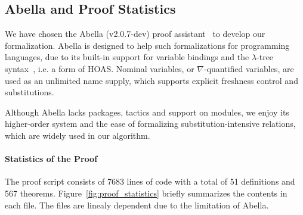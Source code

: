 \subsection{Abella and Proof Statistics}
We have chosen the Abella (v2.0.7-dev) proof assistant~\cite{AbellaDesc} to develop our formalization.
Abella is designed to help such formalizations for programming languages,
due to its built-in support for variable bindings and
the $\lambda$-tree syntax~\cite{}, i.e. a form of HOAS.
Nominal variables, or $\nabla$-quantified variables, are used as an unlimited name supply,
which supports explicit freshness control and substitutions.

Although Abella lacks packages, tactics and support on modules,
we enjoy its higher-order system and the ease of formalizing substitution-intensive relations,
which are widely used in our algorithm.

\paragraph{Statistics of the Proof}
The proof script consists of 7683 lines of code with a total of
51 definitions and 567 theorems.
Figure~\ref{fig:proof_statistics} briefly summarizes the contents in each file.
The files are linealy dependent due to the limitation of Abella.

